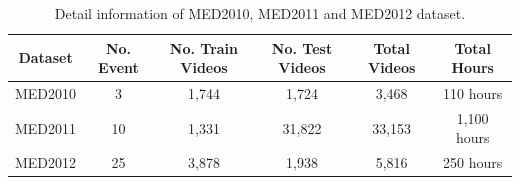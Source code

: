 \begin{table}[h]
		\centering
		\caption{Detail information of MED2010, MED2011 and MED2012 dataset.}
	\begin{tabular}{@{}|c|c|c|c|c|c|@{}}
		\toprule
		Dataset & No. Event & No. Train Videos & No. Test Videos & Total Videos & Total Hours \\ \midrule
		MED2010                     & 3         & 1,744            & 1,724           & 3,468        & 110 hours   \\
		MED2011                     & 10        & 1,331            & 31,822          & 33,153       & 1,100 hours \\
		MED2012                     & 25        & 3,878            & 1,938           & 5,816        & 250 hours   \\ \bottomrule
	\end{tabular}
	\label{c2_exp_dataset}
\end{table}

